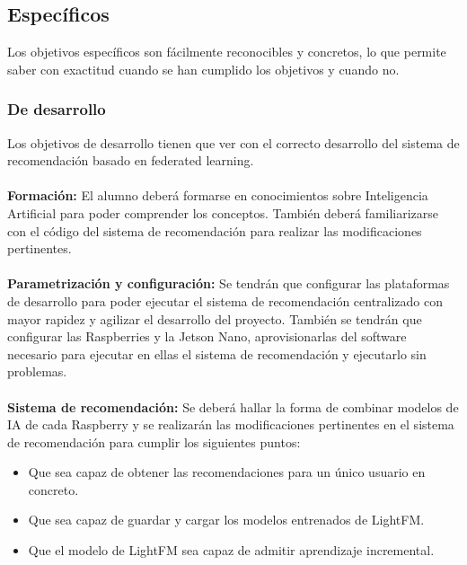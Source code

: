 \subsection{Específicos}
Los objetivos específicos son fácilmente reconocibles y concretos, lo que permite saber con exactitud cuando se han cumplido los objetivos y cuando no.

\subsubsection{De desarrollo}
Los objetivos de desarrollo tienen que ver con el correcto desarrollo del sistema de recomendación basado en federated learning.
\\ \\
\textbf{Formación: }
El alumno deberá formarse en conocimientos sobre Inteligencia Artificial para poder comprender los conceptos. También deberá familiarizarse con el código del sistema de recomendación para realizar las modificaciones pertinentes.
\\ \\
\textbf{Parametrización y configuración: }
Se tendrán que configurar las plataformas de desarrollo para poder ejecutar el sistema de recomendación centralizado con mayor rapidez y agilizar el desarrollo del proyecto. También se tendrán que configurar las Raspberries y la Jetson Nano, aprovisionarlas del software necesario para ejecutar en ellas el sistema de recomendación y ejecutarlo sin problemas.
\\ \\
\textbf{Sistema de recomendación: }
Se deberá hallar la forma de combinar modelos de IA de cada Raspberry y se realizarán las modificaciones pertinentes en el sistema de recomendación para cumplir los siguientes puntos:
\begin{itemize}
    \item Que sea capaz de obtener las recomendaciones para un único usuario en concreto. 
    \item Que sea capaz de guardar y cargar los modelos entrenados de LightFM.
    \item Que el modelo de LightFM sea capaz de admitir aprendizaje incremental.
\end{itemize}

